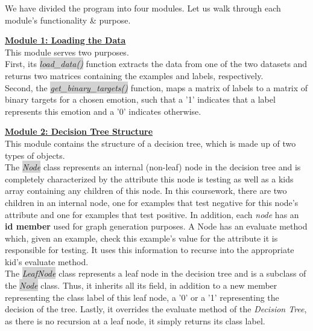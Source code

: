We have divided the program into four modules. Let us walk through each module's functionality \& purpose.

\textbf{\underline{Module 1: Loading the Data}} \\
This module serves two purposes.\\
First, its  \colorbox{lightgray}{\emph{load\_data()}} function extracts the data from one of the two datasets
and returns two matrices containing the examples and labels, respectively. \\
Second, the  \colorbox{lightgray}{\emph{get\_binary\_targets()}} function, maps a matrix of labels to a matrix of binary targets for a chosen emotion,
such that a '1' indicates that a label represents this emotion and a '0' indicates otherwise.

\textbf{\underline{Module 2: Decision Tree Structure}} \\
This module contains the structure of a decision tree, which is made up of two types of objects. \\
The  \colorbox{lightgray}{\emph{Node}} class represents an internal (non-leaf) node in the decision tree and is completely characterized by the attribute
this node is testing as well as a kids array containing any children of this node. In this coursework, there are two children
in an internal node, one for examples that test negative for this node's attribute and one for examples that test positive.
In addition, each \emph{node} has an \textbf{id member} used for graph generation purposes.
A Node has an evaluate method which, given an example, check this example's value for the attribute it is responsible for testing.
It uses this information to recurse into the appropriate kid's evaluate method. \\
The  \colorbox{lightgray}{\emph{LeafNode}} class represents a leaf node in the decision tree and is a subclass of the  \colorbox{lightgray}{\emph{Node}} class.
Thus, it inherits all its field, in addition to a new member representing the class label of this leaf node,
a '0' or a '1' representing the decision of the tree.
Lastly, it overrides the evaluate method of the \emph{Decision Tree}, as there is no recursion at a leaf node, it simply returns its class label.\\


